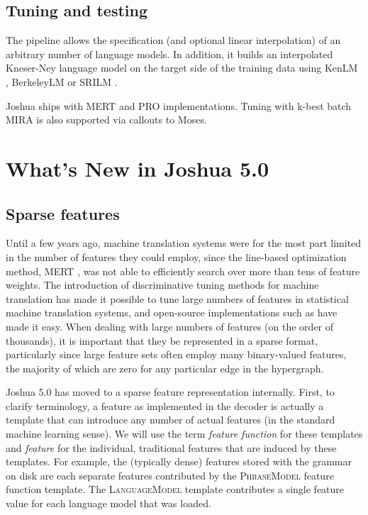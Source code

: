 \documentclass[11pt]{article}
\begin{document}
\subsection{Tuning and testing}

The pipeline allows the specification (and optional linear
interpolation) of an arbitrary number of language models.  In
addition, it builds an interpolated Kneser-Ney language model on the
target side of the training data using KenLM
\cite{KenLM,Heafield-estimate}, BerkeleyLM \cite{BerkeleyLM} or SRILM
\cite{SRILM}. 

Joshua ships with MERT \cite{Och2003} and PRO implementations.  Tuning
with k-best batch MIRA \cite{cherry2012batch} is also supported via
callouts to Moses.

\section{What's New in Joshua 5.0}

\subsection{Sparse features}
\label{sec:sparse}

Until a few years ago, machine translation systems were for the most
part limited in the number of features they could employ, since the
line-based optimization method, MERT \cite{Och2003}, was not able to
efficiently search over more than tens of feature weights.  The
introduction of discriminative tuning methods for machine translation
\cite{liang2006end,tillmann-zhang:2006:COLACL,chiang2008online,PRO2011}
has made it possible to tune large numbers of features in statistical
machine translation systems, and open-source implementations such as
 have made it easy.  When dealing with large
numbers of features (on the order of thousands), it is important that
they be represented in a sparse format, particularly since large
feature sets often employ many binary-valued features, the majority
of which are zero for any particular edge in the hypergraph.

Joshua 5.0 has moved to a sparse feature representation
internally. First, to clarify terminology, a feature as implemented in
the decoder is actually a template that can introduce any number of
actual features (in the standard machine learning sense). We will use
the term \emph{feature function} for these templates and
\emph{feature} for the individual, traditional features that are
induced by these templates. For example, the (typically dense)
features stored with the grammar on disk are each separate features
contributed by the \textsc{PhraseModel} feature function template. The
\textsc{LanguageModel} template contributes a single feature value for
each language model that was loaded.
\end{document}

